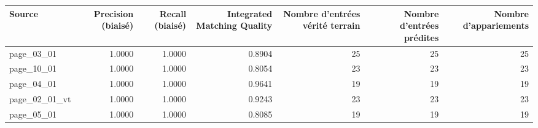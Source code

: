 \begin{tabular}{lrrrrrr}
\toprule
Source & Precision (biaisé) & Recall (biaisé) & Integrated Matching Quality & Nombre d'entrées vérité terrain & Nombre d'entrées prédites & Nombre d'appariements \\
\midrule
page\_03\_01 & 1.0000 & 1.0000 & 0.8904 & 25 & 25 & 25 \\
page\_10\_01 & 1.0000 & 1.0000 & 0.8054 & 23 & 23 & 23 \\
page\_04\_01 & 1.0000 & 1.0000 & 0.9641 & 19 & 19 & 19 \\
page\_02\_01\_vt & 1.0000 & 1.0000 & 0.9243 & 23 & 23 & 23 \\
page\_05\_01 & 1.0000 & 1.0000 & 0.8085 & 19 & 19 & 19 \\
\bottomrule
\end{tabular}
